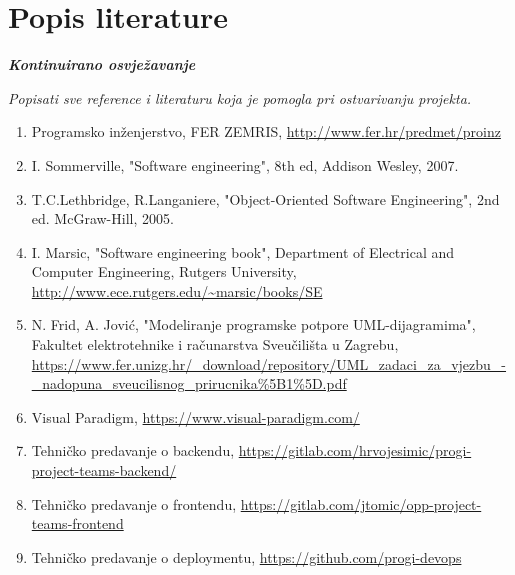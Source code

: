 \chapter*{Popis literature}
	 	
 		\textbf{\textit{Kontinuirano osvježavanje}}
	
		\textit{Popisati sve reference i literaturu koja je pomogla pri ostvarivanju projekta.}
		
		
		\begin{enumerate}
			
			
			\item  Programsko inženjerstvo, FER ZEMRIS, \url{http://www.fer.hr/predmet/proinz}
			
			\item  I. Sommerville, "Software engineering", 8th ed, Addison Wesley, 2007.
			
			\item  T.C.Lethbridge, R.Langaniere, "Object-Oriented Software Engineering", 2nd ed. McGraw-Hill, 2005.
			
			\item  I. Marsic, "Software engineering book", Department of Electrical and Computer Engineering, Rutgers University, \url{http://www.ece.rutgers.edu/~marsic/books/SE}

			\item  N. Frid, A. Jović, "Modeliranje programske potpore UML-dijagramima", Fakultet elektrotehnike i računarstva Sveučilišta u Zagrebu, \url{https://www.fer.unizg.hr/_download/repository/UML_zadaci_za_vjezbu_-_nadopuna_sveucilisnog_prirucnika%5B1%5D.pdf}

			\item  Visual Paradigm, \url{https://www.visual-paradigm.com/}
			
			\item  Tehničko predavanje o backendu, \url{https://gitlab.com/hrvojesimic/progi-project-teams-backend/}
			
			\item  Tehničko predavanje o frontendu, \url{https://gitlab.com/jtomic/opp-project-teams-frontend}
			
			\item  Tehničko predavanje o deploymentu, \url{https://github.com/progi-devops}

		\end{enumerate}
		
		 